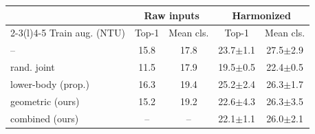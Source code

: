 \begin{tabular}{@{}lcccc@{}}
\toprule
 & \multicolumn{2}{c}{Raw inputs} & \multicolumn{2}{c}{Harmonized} \\
\cmidrule(lr){2-3}\cmidrule(l){4-5}
Train aug. (NTU) & Top-1 & Mean cls. & Top-1 & Mean cls. \\
\midrule
-- & 15.8 & 17.8 & 23.7$\pm$1.1 & 27.5$\pm$2.9 \\
rand. joint & 11.5 & 17.9 & 19.5$\pm$0.5 & 22.4$\pm$0.5 \\
lower-body (prop.) & 16.3 & 19.4 & 25.2$\pm$2.4 & 26.3$\pm$1.7 \\
geometric (ours) & 15.2 & 19.2 & 22.6$\pm$4.3 & 26.3$\pm$3.5 \\
combined (ours) & -- & -- & 22.1$\pm$1.1 & 26.0$\pm$2.1 \\
\bottomrule
\end{tabular}

